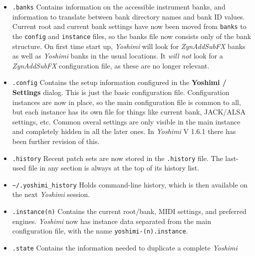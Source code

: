   \begin{itemize}
      \item \texttt{.banks}
         Contains information on the accessible instrument banks, and
         information to translate between bank directory names and bank ID
         values.
         Current root and current bank settings have now been moved from
         \texttt{banks} to the \texttt{config} and \texttt{instance}
         files, so the banks file now consists only of the bank structure.
         On first time start up, \textsl{Yoshimi} will look for
         \textsl{ZynAddSubFX} banks as well as \textsl{Yoshimi} banks in the
         usual locations. It \textsl{will not} look for a \textsl{ZynAddSubFX}
         configuration file, as these are no longer relevant.
      \item \texttt{.config}
         Contains the setup information configured in the
         \textbf{Yoshimi / Settings} dialog.
         This is just the basic configuration file.
         Configuration instances are now in place, so the main configuration
         file is common to all, but each instance has its own file for things
         like current bank, JACK/ALSA settings, etc.
         Common overal settings are only visible in the main instance and
         completely hidden in all the later ones.
         In \textsl{Yoshimi} V 1.6.1 there has been further revision of this.
      \item \texttt{.history}
         Recent patch sets are now stored in the \texttt{.history} file.
         The last-used file in any section is always at the top of its history
         list.
      \item \texttt{\textasciitilde/.yoshimi\_history}
         Holds command-line history, which is then available on the next
         \textsl{Yoshimi} session.
      \item \texttt{.instance(n)}
         Contains the current root/bank, MIDI settings, and preferred engines.
         \textsl{Yoshimi} now has instance data separated from the main
         configuration file, with the name \texttt{yoshimi-(n).instance}.
      \item \texttt{.state}
         Contains the information needed to duplicate a complete \textsl{Yoshimi}

\end{itemize}
